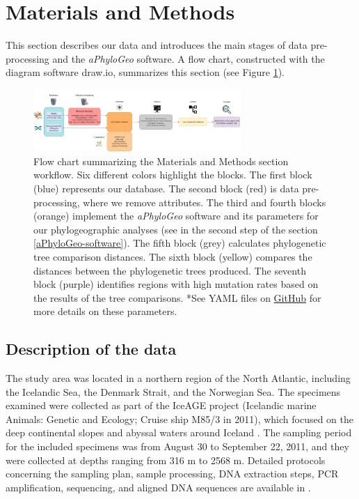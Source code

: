 \section{Materials and Methods}\label{materials-methods}
This section describes our data and introduces the main stages of data pre-processing and the \textit{aPhyloGeo} software. A flow chart, constructed with the diagram software draw.io, summarizes this section (see Figure \ref{fig:fig1}).

\begin{figure}[htbp]
    \centering
    \includegraphics[width=0.7\textwidth]{diagram.drawio.png}
    \caption{Flow chart summarizing the Materials and Methods section workflow. Six different colors highlight the blocks. The first block (blue) represents our database. The second block (red) is data pre-processing, where we remove attributes. The third and fourth blocks (orange) implement the \textit{aPhyloGeo} software and its parameters for our phylogeographic analyses (see in the second step of the section \autoref{aPhyloGeo-software}). The fifth block (grey) calculates phylogenetic tree comparison distances. The sixth block (yellow) compares the distances between the phylogenetic trees produced. The seventh block (purple) identifies regions with high mutation rates based on the results of the tree comparisons. *See YAML files on \href{https://github.com/tahiri-lab/aPhyloGeo}{GitHub} for more details on these parameters. \label{fig:fig1}}
\end{figure}

\subsection{Description of the data}
The study area was located in a northern region of the North Atlantic, including the Icelandic Sea, the Denmark Strait, and the Norwegian Sea. The specimens examined were collected as part of the IceAGE project (Icelandic marine Animals: Genetic and Ecology; Cruise ship M85/3 in 2011), which focused on the deep continental slopes and abyssal waters around Iceland \citep{meisner_prefacebiodiversity_2018}. The sampling period for the included specimens was from August 30 to September 22, 2011, and they were collected at depths ranging from 316 m to 2568 m. Detailed protocols concerning the sampling plan, sample processing, DNA extraction steps, PCR amplification, sequencing, and aligned DNA sequences are available in \citep{uhlir_adding_2021}.

